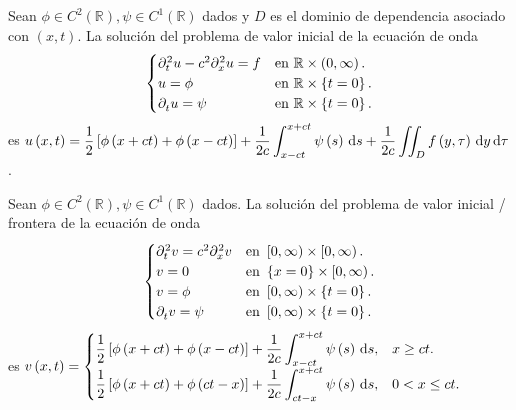 \begin{theorem}
	Sean
	\begin{math}
		\phi\in
		C^{2}\left(\mathbb{R}\right),
		\psi\in
		C^{1}\left(\mathbb{R}\right)
	\end{math}
	dados y $D$ es el dominio de dependencia asociado con
	$\left(x,t\right)$.
	La solución del problema de valor inicial de la ecuación de onda
	\begin{equation*}
		\begin{cases}
			\difcp[2]{u}{t}-c^{2}\difcp[2]{u}{x}=
			f    &
			\text{en }\mathbb{R}\times\left(0,\infty\right). \\
			u=
			\phi &
			\text{en }\mathbb{R}\times\left\{t=0\right\}.    \\
			\difcp{u}{t}=
			\psi &
			\text{en }\mathbb{R}\times\left\{t=0\right\}.
		\end{cases}
	\end{equation*}
	es
	\begin{math}\displaystyle
		u\left(x,t\right)=
		\frac{1}{2}
		\left[
			\phi\left(x+ct\right)+
			\phi\left(x-ct\right)
			\right]+
		\frac{1}{2c}
		\int_{x-ct}^{x+ct}
		\psi\left(s\right)\dl s+
		\frac{1}{2c}
		\iint_{D}
		f\left(y,\tau\right)\dl y\dl\tau
	\end{math}.
\end{theorem}

\begin{theorem}
	Sean
	\begin{math}
		\phi\in
		C^{2}\left(\mathbb{R}\right),
		\psi\in
		C^{1}\left(\mathbb{R}\right)
	\end{math}
	dados.
	La solución del problema de valor inicial / frontera de la ecuación
	de onda
	\begin{equation*}
		\begin{cases}
			\difcp[2]{v}{t}=
			c^{2}\difcp[2]{v}{x} &
			\text{en }\left[0,\infty\right)\times\left[0,\infty\right). \\
			v=
			0                    &
			\text{en }\left\{x=0\right\}\times\left[0,\infty\right).    \\
			v=
			\phi                 &
			\text{en }\left[0,\infty\right)\times\left\{t=0\right\}.    \\
			\difcp{v}{t}=
			\psi                 &
			\text{en }\left[0,\infty\right)\times\left\{t=0\right\}.
		\end{cases}
	\end{equation*}
	es
	\begin{math}
		v\left(x,t\right)=
		\begin{cases}
			\displaystyle
			\frac{1}{2}
			\left[
				\phi\left(x+ct\right)+
				\phi\left(x-ct\right)
				\right]+
			\frac{1}{2c}
			\int_{x-ct}^{x+ct}
			\psi\left(s\right)\dl s, & x\geq ct.   \\
			\displaystyle
			\frac{1}{2}
			\left[
				\phi\left(x+ct\right)+
				\phi\left(ct-x\right)
				\right]+
			\frac{1}{2c}
			\int_{ct-x}^{x+ct}
			\psi\left(s\right)\dl s, & 0<x\leq ct.
		\end{cases}
	\end{math}
\end{theorem}

